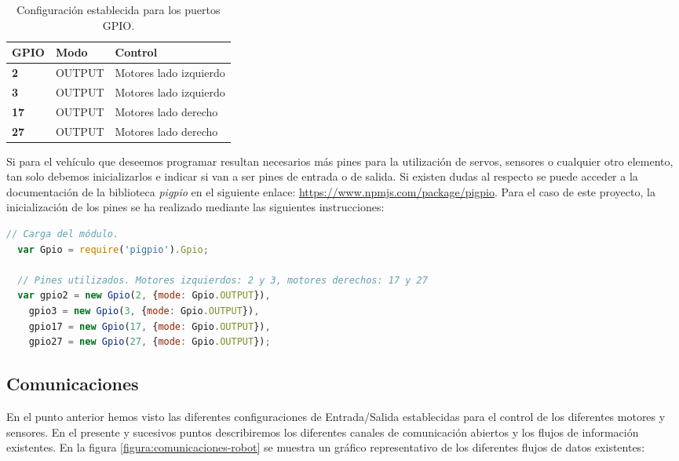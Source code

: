 \begin{table}[H]
  \begin{center}
    \begin{tabular}{|p{2.5cm}|p{2.5cm}|p{4.5cm}|}
      \hline
      {\textbf{GPIO}} & \textbf{ Modo } & \textbf{ Control }\\
      \hline
      {\textbf{ 2 }} & { OUTPUT } & { Motores lado izquierdo }  \\
     \hline
      {\textbf{ 3 }} & { OUTPUT } & { Motores lado izquierdo } \\
      \hline
      {\textbf{ 17 }} & { OUTPUT } & {  Motores lado derecho } \\
      \hline
      {\textbf{ 27 }} & { OUTPUT } & { Motores lado derecho } \\
     \hline   
    \end{tabular}
  \end{center}
\caption{ Configuración establecida para los puertos GPIO. }
\end{table}


Si para el vehículo que deseemos programar resultan necesarios más pines para la utilización de servos, sensores o cualquier otro elemento, tan solo debemos inicializarlos e indicar si van a ser pines de entrada
o de salida. Si existen dudas al respecto se puede acceder a la documentación de la biblioteca \emph{pigpio} en el siguiente enlace: \url{https://www.npmjs.com/package/pigpio}.
Para el caso de este proyecto, la inicialización de los pines se ha realizado mediante las siguientes instrucciones:

\begin{lstlisting}[language=JavaScript]
  // Carga del módulo.
  var Gpio = require('pigpio').Gpio;

  // Pines utilizados. Motores izquierdos: 2 y 3, motores derechos: 17 y 27
  var gpio2 = new Gpio(2, {mode: Gpio.OUTPUT}),
    gpio3 = new Gpio(3, {mode: Gpio.OUTPUT}),
    gpio17 = new Gpio(17, {mode: Gpio.OUTPUT}),
    gpio27 = new Gpio(27, {mode: Gpio.OUTPUT});
\end{lstlisting}



\subsection{Comunicaciones}

En el punto anterior hemos visto las diferentes configuraciones de Entrada/Salida establecidas para el control de los diferentes motores y sensores. En el presente y sucesivos puntos describiremos los diferentes
canales de comunicación abiertos y los flujos de información existentes. En la figura \ref{figura:comunicaciones-robot} se muestra un gráfico representativo de los diferentes flujos de datos existentes:


